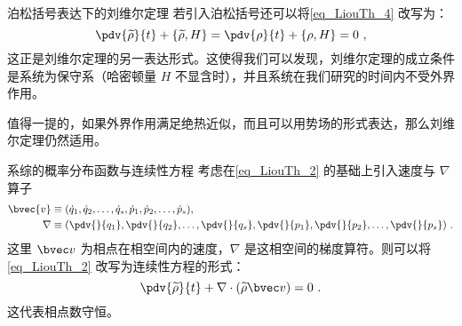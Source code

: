 \begin{corollary}{泊松括号表达下的刘维尔定理}
若引入泊松括号还可以将\autoref{eq_LiouTh_4} 改写为：
\begin{equation}
\pdv{\widetilde \rho}{t} + \{\widetilde \rho, H\} = \pdv{\rho}{t} + \{\rho , H\} = 0 ~,
\end{equation}
这正是刘维尔定理的另一表达形式。这使得我们可以发现，刘维尔定理的成立条件是系统为保守系（哈密顿量 $H$ 不显含时），并且系统在我们研究的时间内不受外界作用。

值得一提的，如果外界作用满足绝热近似，而且可以用势场的形式表达，那么刘维尔定理仍然适用。
\end{corollary}


\begin{corollary}{系综的概率分布函数与连续性方程}
考虑在\autoref{eq_LiouTh_2} 的基础上引入速度与 $\nabla$ 算子
\begin{equation}
\begin{aligned}
\bvec{v} &\equiv (\dot q_1, \dot q_2, \dots, \dot q_s, \dot p_1, \dot p_2, \dots, \dot p_s), \\
\nabla &\equiv (\pdv{}{q_1}, \pdv{}{q_2}, \dots, \pdv{}{q_s}, \pdv{}{p_1}, \pdv{}{p_2}, \dots, \pdv{}{p_s}) ~.
\end{aligned}
\end{equation}
这里 $\bvec v$ 为相点在相空间内的速度，$\nabla$ 是这相空间的梯度算符。则可以将\autoref{eq_LiouTh_2} 改写为连续性方程的形式：
\begin{equation}
\pdv{\widetilde \rho}{t} + \nabla \cdot \left(  \widetilde \rho \bvec v\right) = 0 ~.
\end{equation}
这代表相点数守恒。
\end{corollary}
